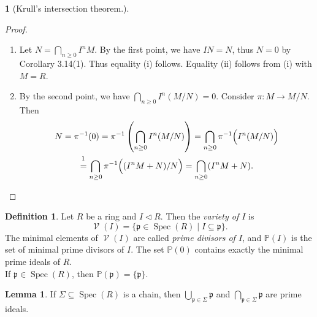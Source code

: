 \documentclass[12pt,a4paper]{report}
\theoremstyle{definition}
\newtheorem{lemma}[theorem]{Lemma}
\newtheorem{defn}[theorem]{Definition}
\theoremstyle{num.custom-title}
\newtheorem{teo_custom-title}[theorem]{} %
\DeclareMathOperator{\V}{\mathcal{V}}
\DeclareMathOperator{\sse}{\subseteq}
\DeclareMathOperator{\Spec}{Spec}
\newcommand{\p}{\mathfrak{p}}
\renewcommand{\P}{\mathbb{P}}
\begin{document}
\begin{teo_custom-title}[Krull's intersection theorem.]
\begin{proof}
\begin{enumerate}
So we have $N \sse I^h M \sse L$, and thus $N \sse I^h M \cap N \sse L \cap N = IN \sse N$, i.e. $N=IN$.
\item Let $N = \bigcap_{n \geq 0} I^nM$. By the first point, we have $IN=N$, thus $N=0$ by Corollary 3.14(1). Thus equality (i) follows. Equality (ii) follows from (i) with $M=R$.
\item By the second point, we have $\bigcap_{n \geq 0} I^n (M/N) = 0$. Consider $\pi : M \to M/N$. Then
\begin{multline*}
N = \pi^{-1}(0) = \pi^{-1} \left( \bigcap_{n \geq 0} I^n (M/N) \right) = \bigcap_{n \geq 0} \pi^{-1} \Big( I^n (M/N) \Big)\\
\stackrel{\footnotemark}{=} \bigcap_{n \geq 0} \pi^{-1} \Big( (I^n M + N)/N \Big) = \bigcap_{n \geq 0} (I^n M + N).
\end{multline*}
\end{enumerate}
\end{proof}
\end{teo_custom-title}

\begin{defn}
Let $R$ be a ring and $I \lhd R$. Then the \emph{variety of $I$} is
\[
\V(I) = \{ \p \in \Spec(R) \mid I \sse \p \}.
\]
The minimal elements of $\V(I)$ are called \emph{prime divisors of $I$}, and $\P(I)$ is the set of minimal prime divisors of $I$. The set $\P(0)$ contains exactly the minimal prime ideals of $R$.\\
If $\p \in \Spec(R)$, then $\P(\p)=\{\p\}$.
\end{defn}

\begin{lemma}
If $\Sigma \sse \Spec(R)$ is a chain, then $\bigcup_{\p \in \Sigma} \p$ and $\bigcap_{\p \in \Sigma} \p$ are prime ideals.
\end{lemma}
\end{document}
